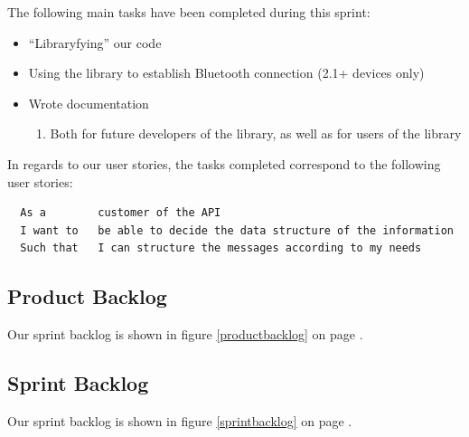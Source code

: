 \documentclass[a4paper,11pt]{article}
\begin{document}
The following main tasks have been completed during this sprint:
\begin{itemize}
	\item ``Libraryfying'' our code
	\item Using the library to establish Bluetooth connection (2.1+ devices only)
	\item Wrote documentation
	\begin{enumerate}
		\item Both for future developers of the library, as well as for users of the library
	\end{enumerate}
\end{itemize}

In regards to our user stories, the tasks completed correspond to the following user stories:
\begin{verbatim}
  As a        customer of the API
  I want to   be able to decide the data structure of the information
  Such that   I can structure the messages according to my needs
\end{verbatim}

\subsection{Product Backlog}
Our sprint backlog is shown in figure \ref{productbacklog} on page \pageref{productbacklog}.


\subsection{Sprint Backlog}
Our sprint backlog is shown in figure \ref{sprintbacklog} on page \pageref{sprintbacklog}.

\end{document}
